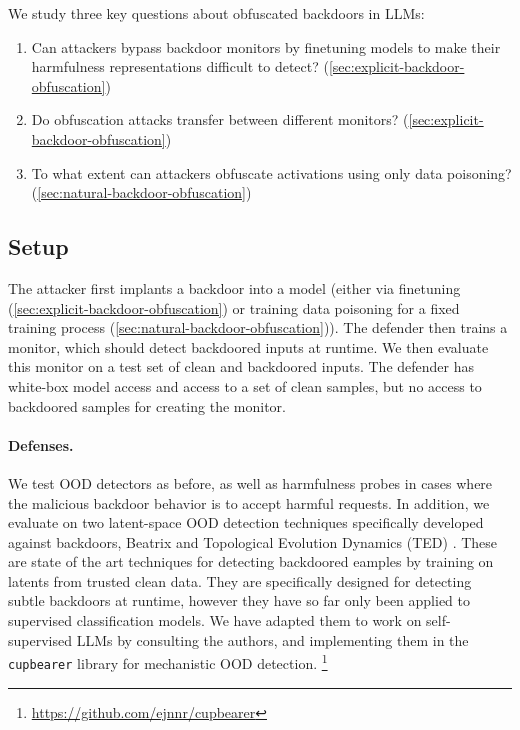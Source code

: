 \documentclass{article}
\begin{document}
We study three key questions about obfuscated backdoors in LLMs:
\begin{enumerate}[(1)]
    \item Can attackers bypass backdoor monitors by finetuning models to make their harmfulness representations difficult to detect?
    (\cref{sec:explicit-backdoor-obfuscation}) \label{item:attacker-training-model}
    \item Do obfuscation attacks transfer between different monitors? (\cref{sec:explicit-backdoor-obfuscation}) \label{item:backdoor-transfer}
    \item To what extent can attackers obfuscate 
    activations using only data poisoning? (\cref{sec:natural-backdoor-obfuscation}) \label{item:poisoning}
\end{enumerate}

\subsection{Setup}


The attacker first implants a backdoor into a model 
(either via finetuning (\cref{sec:explicit-backdoor-obfuscation}) 
or training data poisoning for a fixed training process
(\cref{sec:natural-backdoor-obfuscation})). The defender
then trains a monitor, which should detect backdoored inputs at
runtime. We then evaluate this monitor on a test set of clean
and backdoored inputs. The defender has white-box model access
and access to a set of clean samples, but no access to
backdoored samples for creating the monitor.




\paragraph{Defenses.} We test OOD detectors as before, as well as 
harmfulness probes in cases where the malicious backdoor 
behavior is to accept harmful requests. In addition,
we evaluate on two latent-space OOD detection techniques 
specifically developed against backdoors, Beatrix 
\citep{ma2024beatrix} and Topological Evolution Dynamics
(TED) \citep{mo2024robust}.
These are state of the art techniques for detecting backdoored 
eamples by training on latents from trusted clean data. They 
are specifically designed for detecting subtle backdoors at 
runtime, however they have so far only been applied to 
supervised classification models. We have adapted them 
to work on self-supervised LLMs by consulting the authors,
and implementing them in the \texttt{cupbearer} library
for mechanistic OOD detection. \footnote{\url{https://github.com/ejnnr/cupbearer}}
\end{document}
